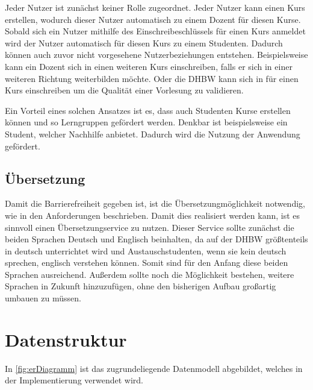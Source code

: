 Jeder Nutzer ist zunächst keiner Rolle zugeordnet.
Jeder Nutzer kann einen Kurs erstellen, wodurch dieser Nutzer automatisch zu einem Dozent für diesen Kurse.
Sobald sich ein Nutzer mithilfe des Einschreibeschlüssels für einen Kurs anmeldet wird der Nutzer automatisch für diesen Kurs zu einem Studenten.
Dadurch können auch zuvor nicht vorgesehene Nutzerbeziehungen entstehen.
Beispielsweise kann ein Dozent sich in einen weiteren Kurs einschreiben, falls er sich in einer weiteren Richtung weiterbilden möchte.
Oder die DHBW kann sich in für einen Kurs einschreiben um die Qualität einer Vorlesung zu validieren.


Ein Vorteil eines solchen Ansatzes ist es, dass auch Studenten Kurse erstellen können und so Lerngruppen gefördert werden.
Denkbar ist beispielsweise ein Student, welcher Nachhilfe anbietet.
Dadurch wird die Nutzung der Anwendung gefördert.

\subsection{Übersetzung}

Damit die Barrierefreiheit gegeben ist, ist die Übersetzungmöglichkeit notwendig, wie in den Anforderungen beschrieben. Damit dies 
realisiert werden kann, ist es sinnvoll einen Übersetzungservice zu nutzen. Dieser Service sollte zunächst die beiden Sprachen Deutsch und 
Englisch beinhalten, da auf der DHBW größtenteils in deutsch unterrichtet wird und Austauschstudenten, wenn sie kein deutsch sprechen, englisch 
verstehen können. Somit sind für den Anfang diese beiden Sprachen ausreichend. Außerdem sollte noch die Möglichkeit bestehen, weitere Sprachen 
in Zukunft hinzuzufügen, ohne den bisherigen Aufbau großartig umbauen zu müssen. 






\section{Datenstruktur} %
In \autoref{fig:erDiagramm} ist das zugrundeliegende Datenmodell abgebildet, welches in der Implementierung verwendet wird.

